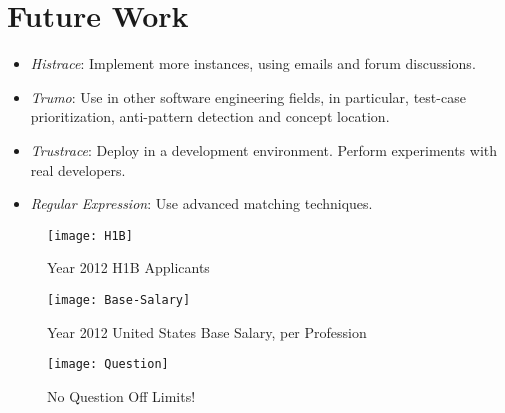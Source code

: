 \documentclass[12pt,hyperref=true,mathserif]{beamer}
\begin{document}
\section{Future Work}
\begin{frame}
\begin{itemize}
  \item \textit{Histrace}: Implement more instances, using emails and forum discussions.\\[6pt]
  \item \textit{Trumo}: Use in other software engineering fields, in particular, test-case prioritization, anti-pattern detection and concept location.\\[6pt]
  \item \textit{Trustrace}: Deploy in a development environment. Perform experiments with real developers.\\[6pt]
  \item \textit{Regular Expression}: Use advanced matching techniques.\\[6pt]
\end{itemize}
\end{frame}

\begin{frame}
\begin{figure}
  \centering
  \texttt{[image: H1B]}\\
  \caption{Year 2012 H1B Applicants}\label{fig:H1B}
\end{figure}
\end{frame}

\begin{frame}
\begin{figure}
  \centering
  \texttt{[image: Base-Salary]}\\
  \caption{Year 2012 United States Base Salary, per Profession}\label{fig:BaseSalary}
\end{figure}
\end{frame}

\begin{frame}
\begin{figure}
  \centering
  \texttt{[image: Question]}\\
  \caption{No Question Off Limits!}\label{fig:QuestionandAnswer}
\end{figure}

\end{frame}
\end{document}
